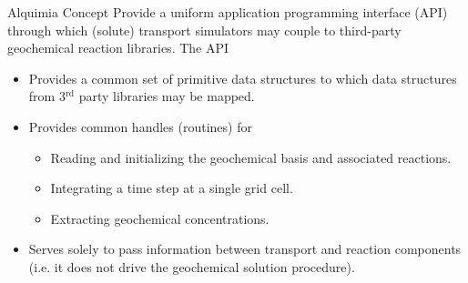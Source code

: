 \documentclass{beamer}
\begin{document}
\begin{frame}{Alquimia Concept}
Provide a uniform application programming interface (API) through which (solute) transport simulators may couple to third-party geochemical reaction libraries.  The API
\begin{itemize}
\item Provides a common set of primitive data structures to which data structures from 3$^\text{rd}$ party libraries may be mapped.
\item Provides common handles (routines) for
\begin{itemize}
\item Reading and initializing the geochemical basis and associated reactions.
\item Integrating a time step at a single grid cell.
\item Extracting geochemical concentrations.
\end{itemize}
\item Serves solely to pass information between transport and reaction components (i.e. it does not drive the geochemical solution procedure).
\end{itemize}
\end{frame}
\end{document}
